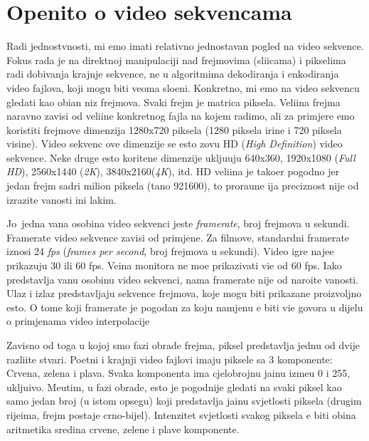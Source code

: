 \section{Op\cj enito o video sekvencama}
Radi jednostvnosti, mi \cj emo imati relativno jednostavan pogled na video sekvence. Fokus rada je na direktnoj manipulaciji nad frejmovima (sli\ch icama) i pikselima radi dobivanja krajnje sekvence, 
ne u algoritmima dekodiranja i enkodiranja video fajlova, koji mogu biti veoma slo\zh eni. Konkretno, mi \cj emo na video sekvencu gledati kao obi\ch an niz frejmova. Svaki frejm je matrica piksela. 
Veli\ch ina frejma naravno zavisi od veli\ch ine konkretnog fajla na kojem radimo, ali za primjere \cj emo koristiti frejmove dimenzija 1280x720 piksela (1280 piksela \sh irine i 720 piksela visine).
 Video sekvenc  ove dimenzije se \ch esto zovu HD (\textit{High Definition}) video sekvence. Neke druge \ch esto kori\sh tene dimenzije uklju\ch uju 640x360, 1920x1080 (\textit{Full HD}), 2560x1440 
 (\textit{2K}), 3840x2160(\textit{4K}), itd. HD veli\ch ina je tako\dj er pogodno jer jedan frejm sadr\zh i  milion piksela (ta\ch no 921600), \sh to prora\ch une \ch ija preciznost nije od izrazite 
 va\zh nosti \ch ini lak\sh im. 
 
 Jo\sh\ jedna va\zh na osobina video sekvenci jeste \textit{framerate}, broj frejmova u sekundi. Framerate video sekvence zavisi od primjene. Za filmove, standardni framerate
iznosi 24 \textit{fps} (\textit{frames per second}, broj frejmova u sekundi). Video igre naj\ch e\sh \cj e prikazuju 30 ili 60 fps. Ve\cj ina monitora ne mo\zh e prikazivati vi\sh e od 60 fps. Iako predstavlja
va\zh nu osobinu video sekvenci, nama framerate nije od naro\ch ite va\zh nosti. Ulaz i izlaz predstavljaju sekvence frejmova, koje mogu biti prikazane proizvoljno \ch esto. O tome koji framerate
je pogodan za koju namjenu \cj e biti vi\sh e govora u dijelu o primjenama video interpolacije

Zavisno od toga u kojoj smo fazi obrade frejma, piksel predstavlja jednu od dvije razli\ch ite stvari. Po\ch etni i krajnji video fajlovi imaju piksele sa 3 komponente: Crvena, zelena i plava. Svaka 
komponenta ima cjelobrojnu ja\ch inu izme\dj u 0 i 255, uklju\ch ivo. Me\dj utim, u fazi obrade, \ch esto je pogodnije gledati na svaki piksel kao samo jedan broj (u istom opsegu) koji
predstavlja ja\ch inu svjetlosti piksela (drugim rije\ch ima, frejm postaje crno-bijel). Intenzitet svjetlosti svakog piksela \cj e biti obi\ch na aritmeti\ch ka sredina crvene, zelene i plave komponente.

